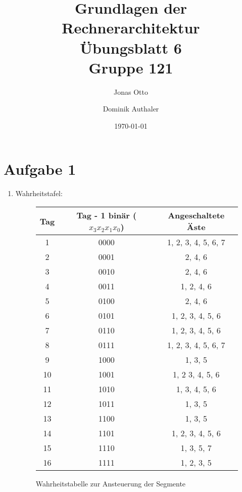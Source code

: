 \documentclass[a4paper]{article}
\title{Grundlagen der Rechnerarchitektur\\ Übungsblatt 6\\Gruppe 121\\}
\author{Jonas Otto\and Dominik Authaler}
\date{\today}
\begin{document}
\maketitle

\section*{Aufgabe 1}
\begin{enumerate}[label=\alph*)]
	\item Wahrheitstafel:
	\begin{figure}[h!]
		\centering
		\begin{tabular}{|c|c|c|}
			\hline
			Tag & Tag - 1 binär ($x_3x_2x_1x_0$) & Angeschaltete Äste \\
			\hline
			1 & 0000 & 1, 2, 3, 4, 5, 6, 7\\
			2 & 0001 & 2, 4, 6\\
			3 & 0010 & 2, 4, 6\\
			4 & 0011 & 1, 2, 4, 6\\
			5 & 0100 & 2, 4, 6\\
			6 & 0101 & 1, 2, 3, 4, 5, 6\\
			7 & 0110 & 1, 2, 3, 4, 5, 6\\
			8 & 0111 & 1, 2, 3, 4, 5, 6, 7\\
			9 & 1000 & 1, 3, 5\\
			10 & 1001 & 1, 2 3, 4, 5, 6\\
			11 & 1010 & 1, 3, 4, 5, 6\\
			12 & 1011 & 1, 3, 5\\
			13 & 1100 & 1, 3, 5\\
			14 & 1101 & 1, 2, 3, 4, 5, 6\\
			15 & 1110 & 1, 3, 5, 7\\
			16 & 1111 & 1, 2, 3, 5\\
			\hline
		\end{tabular}
		\caption{Wahrheitstabelle zur Ansteuerung der Segmente}
	\end{figure}
\end{enumerate}
\end{document}
